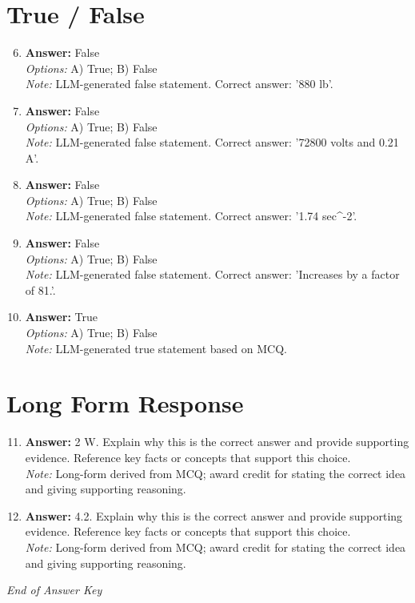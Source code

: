 \documentclass[12pt]{article}
\begin{document}
\section*{True / False}
\begin{enumerate}[label=\arabic*.]
\setcounter{enumi}{5}
\item \textbf{Answer:} False
\\ \textit{Options:} A) True; B) False
\\ \textit{Note:} LLM-generated false statement. Correct answer: '880 lb'.
\item \textbf{Answer:} False
\\ \textit{Options:} A) True; B) False
\\ \textit{Note:} LLM-generated false statement. Correct answer: '72800 volts and 0.21 A'.
\item \textbf{Answer:} False
\\ \textit{Options:} A) True; B) False
\\ \textit{Note:} LLM-generated false statement. Correct answer: '1.74 sec^-2'.
\item \textbf{Answer:} False
\\ \textit{Options:} A) True; B) False
\\ \textit{Note:} LLM-generated false statement. Correct answer: 'Increases by a factor of 81.'.
\item \textbf{Answer:} True
\\ \textit{Options:} A) True; B) False
\\ \textit{Note:} LLM-generated true statement based on MCQ.
\end{enumerate}

\section*{Long Form Response}
\begin{enumerate}[label=\arabic*.]
\setcounter{enumi}{10}
\item \textbf{Answer:} 2 W. Explain why this is the correct answer and provide supporting evidence. Reference key facts or concepts that support this choice.
\\ \textit{Note:} Long-form derived from MCQ; award credit for stating the correct idea and giving supporting reasoning.
\item \textbf{Answer:} 4.2. Explain why this is the correct answer and provide supporting evidence. Reference key facts or concepts that support this choice.
\\ \textit{Note:} Long-form derived from MCQ; award credit for stating the correct idea and giving supporting reasoning.
\end{enumerate}

\vfill
\noindent\textit{End of Answer Key}
\end{document}

